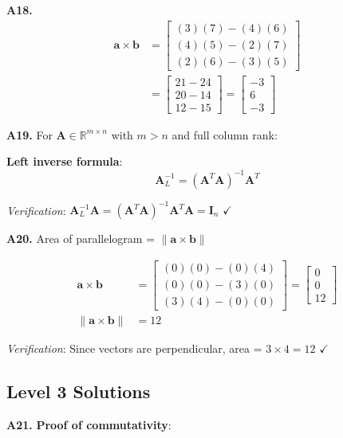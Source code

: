 \documentclass[12pt,a4paper]{article}
\theoremstyle{definition}
\begin{document}
\textbf{A18.}
\begin{align}
\mathbf{a} \times \mathbf{b} &= \begin{bmatrix}
(3)(7) - (4)(6) \\
(4)(5) - (2)(7) \\
(2)(6) - (3)(5)
\end{bmatrix} \\
&= \begin{bmatrix}
21 - 24 \\
20 - 14 \\
12 - 15
\end{bmatrix} = \begin{bmatrix} -3 \\ 6 \\ -3 \end{bmatrix}
\end{align}

\textbf{A19.} For $\mathbf{A} \in \mathbb{R}^{m \times n}$ with $m > n$ and full column rank:

\textbf{Left inverse formula}:
\[
\mathbf{A}_L^{-1} = (\mathbf{A}^T\mathbf{A})^{-1}\mathbf{A}^T
\]

\textit{Verification}: $\mathbf{A}_L^{-1}\mathbf{A} = (\mathbf{A}^T\mathbf{A})^{-1}\mathbf{A}^T\mathbf{A} = \mathbf{I}_n$ $\checkmark$

\textbf{A20.} Area of parallelogram = $\|\mathbf{a} \times \mathbf{b}\|$

\begin{align}
\mathbf{a} \times \mathbf{b} &= \begin{bmatrix}
(0)(0) - (0)(4) \\
(0)(0) - (3)(0) \\
(3)(4) - (0)(0)
\end{bmatrix} = \begin{bmatrix} 0 \\ 0 \\ 12 \end{bmatrix} \\
\|\mathbf{a} \times \mathbf{b}\| &= 12
\end{align}

\textit{Verification}: Since vectors are perpendicular, area = $3 \times 4 = 12$ $\checkmark$

\subsection{Level 3 Solutions}

\textbf{A21.} \textbf{Proof of commutativity}:
\end{document}
